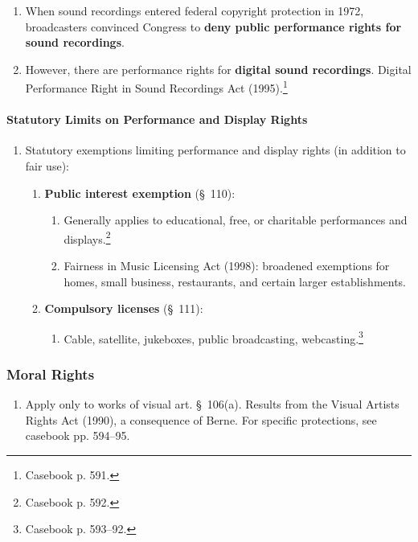 \begin{enumerate}
    \item When sound recordings entered federal copyright protection in 1972, 
    broadcasters convinced Congress to \textbf{deny public performance rights 
    for sound recordings}.
    \item However, there are performance rights for \textbf{digital sound 
    recordings}. Digital Performance Right in Sound Recordings Act 
    (1995).\footnote{Casebook p. 591.}
\end{enumerate}

\paragraph{Statutory Limits on Performance and Display Rights}

\begin{enumerate}
    \item Statutory exemptions limiting performance and display rights (in 
    addition to fair use):
    \begin{enumerate}
        \item \textbf{Public interest exemption} (\S\ 110):
        \begin{enumerate}
            \item Generally applies to educational, free, or charitable 
            performances and displays.\footnote{Casebook p. 592.}
            \item Fairness in Music Licensing Act (1998): broadened exemptions 
            for homes, small business, restaurants, and certain larger 
            establishments.
        \end{enumerate}
        \item \textbf{Compulsory licenses} (\S\ 111):
        \begin{enumerate}
            \item Cable, satellite, jukeboxes, public broadcasting, 
            webcasting.\footnote{Casebook p. 593--92.}
        \end{enumerate}
    \end{enumerate}
\end{enumerate}

\subsubsection{Moral Rights}

\begin{enumerate}
    \item Apply only to works of visual art. \S\ 106(a). Results from the 
    Visual Artists Rights Act (1990), a consequence of Berne. For specific 
    protections, see casebook pp. 594--95.
\end{enumerate}

